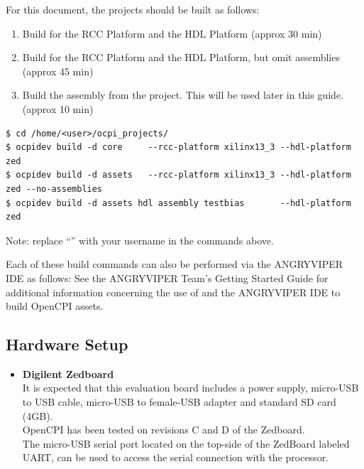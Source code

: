 \begin{flushleft}
For this document, the projects should be built as follows:\\

\begin{enumerate}
	\item Build  for the  RCC Platform and the  HDL Platform (approx 30 min)
	\item Build  for the  RCC Platform and the  HDL Platform, but omit assemblies (approx 45 min)
	\item Build the  assembly from the  project. This will be used later in this guide. (approx 10 min)
\end{enumerate}
\begin{lstlisting}[showspaces=false]
$ cd /home/<user>/ocpi_projects/
$ ocpidev build -d core     --rcc-platform xilinx13_3 --hdl-platform zed
$ ocpidev build -d assets   --rcc-platform xilinx13_3 --hdl-platform zed --no-assemblies
$ ocpidev build -d assets hdl assembly testbias       --hdl-platform zed
\end{lstlisting}
Note: replace ``'' with your username in the commands above.\\\medskip

Each of these build commands can also be performed via the ANGRYVIPER IDE as follows:
\OcpidevBuild
See the ANGRYVIPER Team's Getting Started Guide for additional information concerning the use of  and the ANGRYVIPER IDE to build OpenCPI assets.

\subsection{Hardware Setup}
\begin{itemize}
\item \textbf{Digilent Zedboard}\\ \medskip
It is expected that this evaluation board includes a power supply, micro-USB to USB cable, micro-USB to female-USB adapter and standard SD card (4GB). \\ \medskip
OpenCPI has been tested on revisions C and D of the Zedboard.\\ \medskip
The micro-USB serial port located on the top-side of the ZedBoard labeled UART, can be used to access the serial connection with the processor.\medskip


\end{itemize}
\end{flushleft}
